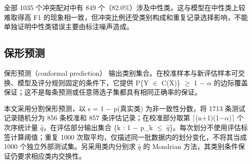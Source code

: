 全部 1035 个冲突配对中有 849 个（82.0\%）涉及中性类。这与模型在中性类上较难取得高 F1 的现象相一致，但冲突比例还受类别构成和重复记录选择影响，不能单独证明中性类错误主要由标注噪声造成。

\FloatBarrier\subsection{保形预测}

保形预测（conformal prediction）\cite{ref31,ref32} 输出类别集合。在校准样本与新评估样本可交换、模型及评分规则固定的条件下，它提供 P\{Y \(\in\) C(X)\} \(\ge\) 1 \(-\) \(\alpha\) 的边际覆盖保证；这不是每条预测或任意筛选子集都具有相同正确率的保证。

本文采用分割保形预测，以 s = 1 \(-\) p(真实类) 为非一致性分数，将 1713 条测试记录随机分为 856 条校准和 857 条评估记录；在校准部分取第 \(\lceil\)(n+1)(1\(-\alpha\))\(\rceil\) 个次序统计量 \(\hat q\)，在评估部分输出集合 \{k : 1 \(-\) p\_k \(\le\) \(\hat q\)\}。每次划分不使用评估标签计算阈值；重复 1000 次取平均，仅描述同一批数据内的划分变化，不将其当成 1000 个独立外部测试集。另采用类内分别求 \(\hat q\) 的 Mondrian 方法，其类别条件保证仍要求相应类内交换性。

